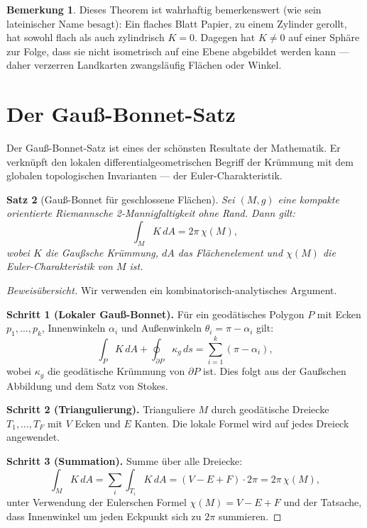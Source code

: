 \documentclass[12pt,a4paper]{amsart}
\newtheorem{theorem}{Satz}[section]
\theoremstyle{definition}
\newtheorem{bemerkung}[theorem]{Bemerkung}
\begin{document}
\begin{bemerkung}
Dieses Theorem ist wahrhaftig bemerkenswert (wie sein lateinischer Name besagt):
Ein flaches Blatt Papier, zu einem Zylinder gerollt, hat sowohl flach als auch
zylindrisch $K = 0$. Dagegen hat $K \neq 0$ auf einer Sphäre zur Folge, dass
sie nicht isometrisch auf eine Ebene abgebildet werden kann --- daher verzerren
Landkarten zwangsläufig Flächen oder Winkel.
\end{bemerkung}

\section{Der Gauß-Bonnet-Satz}
\label{sec:gauss-bonnet}

Der Gauß-Bonnet-Satz ist eines der schönsten Resultate der Mathematik.
Er verknüpft den lokalen differentialgeometrischen Begriff der Krümmung mit
dem globalen topologischen Invarianten --- der Euler-Charakteristik.

\begin{theorem}[Gauß-Bonnet für geschlossene Flächen]
\label{thm:gauss-bonnet}
Sei $(M, g)$ eine kompakte orientierte Riemannsche 2-Mannigfaltigkeit ohne Rand.
Dann gilt:
\[
  \int_M K\,dA = 2\pi\,\chi(M),
\]
wobei $K$ die Gaußsche Krümmung, $dA$ das Flächenelement und $\chi(M)$
die Euler-Charakteristik von $M$ ist.
\end{theorem}

\begin{proof}[Beweisübersicht]
Wir verwenden ein kombinatorisch-analytisches Argument.

\textbf{Schritt 1 (Lokaler Gauß-Bonnet).} Für ein geodätisches Polygon $P$
mit Ecken $p_1, \ldots, p_k$, Innenwinkeln $\alpha_i$ und Außenwinkeln
$\theta_i = \pi - \alpha_i$ gilt:
\[
  \int_P K\,dA + \oint_{\partial P} \kappa_g\,ds = \sum_{i=1}^k (\pi - \alpha_i),
\]
wobei $\kappa_g$ die geodätische Krümmung von $\partial P$ ist.
Dies folgt aus der Gaußschen Abbildung und dem Satz von Stokes.

\textbf{Schritt 2 (Triangulierung).} Trianguliere $M$ durch geodätische Dreiecke
$T_1, \ldots, T_F$ mit $V$ Ecken und $E$ Kanten. Die lokale Formel wird auf
jedes Dreieck angewendet.

\textbf{Schritt 3 (Summation).} Summe über alle Dreiecke:
\[
  \int_M K\,dA = \sum_{i} \int_{T_i} K\,dA
  = (V - E + F) \cdot 2\pi = 2\pi\,\chi(M),
\]
unter Verwendung der Eulerschen Formel $\chi(M) = V - E + F$ und der
Tatsache, dass Innenwinkel um jeden Eckpunkt sich zu $2\pi$ summieren.
\end{proof}
\end{document}
